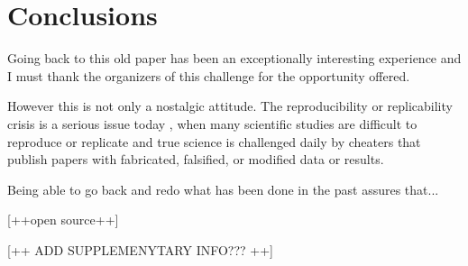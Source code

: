  

\section{Conclusions}

Going back to this old paper has been an exceptionally interesting experience and I must thank the organizers of this challenge for the opportunity offered.

However this is not only a nostalgic attitude. The reproducibility or replicability crisis is a serious issue today \cite{Miyakawa:2020}, when many scientific studies are difficult to reproduce or replicate and  true science is challenged daily by cheaters that publish papers with fabricated, falsified, or modified data or results.

Being able to go back and redo what has been done in the past assures that...

[++open source++]

[++ ADD SUPPLEMENYTARY INFO??? ++]



%
%






